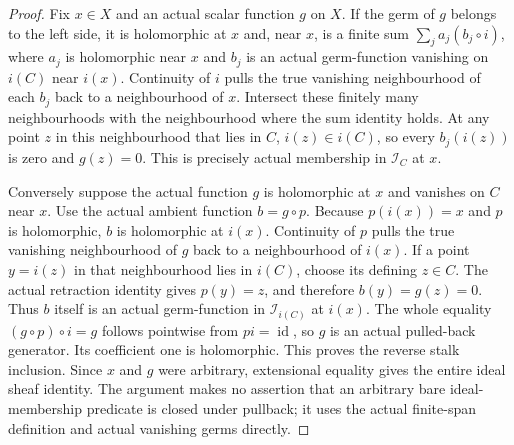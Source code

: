 \begin{proof}
Fix $x\in X$ and an actual scalar function $g$ on $X$. If the germ of
$g$ belongs to the left side, it is holomorphic at $x$ and, near $x$,
is a finite sum $\sum_j a_j(b_j\circ i)$, where $a_j$ is holomorphic
near $x$ and $b_j$ is an actual germ-function vanishing on $i(C)$ near
$i(x)$. Continuity of $i$ pulls the true vanishing neighbourhood of
each $b_j$ back to a neighbourhood of $x$. Intersect these finitely
many neighbourhoods with the neighbourhood where the sum identity
holds. At any point $z$ in this neighbourhood that lies in $C$,
$i(z)\in i(C)$, so every $b_j(i(z))$ is zero and $g(z)=0$.
This is precisely actual membership in $\mathcal I_C$ at $x$.

Conversely suppose the actual function $g$ is holomorphic at $x$ and
vanishes on $C$ near $x$. Use the actual ambient function $b=g\circ p$.
Because $p(i(x))=x$ and $p$ is holomorphic, $b$ is holomorphic at
$i(x)$. Continuity of $p$ pulls the true vanishing neighbourhood of
$g$ back to a neighbourhood of $i(x)$. If a point $y=i(z)$ in that
neighbourhood lies in $i(C)$, choose its defining $z\in C$.
The actual retraction identity gives $p(y)=z$, and therefore
$b(y)=g(z)=0$. Thus $b$ itself is an actual germ-function in
$\mathcal I_{i(C)}$ at $i(x)$. The whole equality
$(g\circ p)\circ i=g$ follows pointwise from $pi=\operatorname{id}$,
so $g$ is an actual pulled-back generator. Its coefficient one is
holomorphic. This proves the reverse stalk inclusion. Since $x$ and
$g$ were arbitrary, extensional equality gives the entire ideal sheaf
identity. The argument makes no assertion that an arbitrary bare
ideal-membership predicate is closed under pullback; it uses the
actual finite-span definition and actual vanishing germs directly.
\end{proof}

